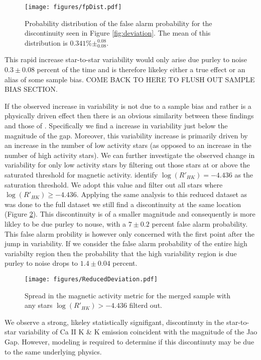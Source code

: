 \begin{figure}
  \centering
  \texttt{[image: figures/fpDist.pdf]}
  \caption{Probability distribution of the false alarm probability for the
  discontinuity seen in Figure \ref{fig:deviation}. The mean of this
  distribution is $0.341\%\pm^{0.08}_{0.08}$.}
  \label{fig:dist}
\end{figure}

This rapid increase star-to-star variability would only arise due purley to
noise $0.3\pm0.08$ percent of the time and is therefore likeley either a true
effect or an alias of some sample bias. {\color{red} COME BACK TO HERE TO FLUSH
OUT SAMPLE BIAS SECTION.}

If the observed increase in variability is not due to a sample bias and rather
is a physically driven effect then there is an obvious similarity between these
findings and those of \citep{Jao2023}. Specifically we find a increase in
variability just below the magnitude of the gap. Moreover, this variability
increase is primarily driven by an increase in the number of low activity stars
(as opposed to an increase in the number of high activity stars). We can
further investigate the observed change in variability for only low activity
stars by filtering out those stars at or above the saturated threshold for
magnetic activity. \citet{Boudreaux2022} identify $\log(R'_{HK}) = -4.436$ as
the saturation threshold. We adopt this value and filter out all stars where
$\log(R'_{HK}) \geq -4.436$. Applying the same analysis to this reduced dataset
as was done to the full dataset we still find a discontinuity at the same
location (Figure \ref{fig:reduced}). This discontinuity is of a smaller
magnitude and consequently is more likley to be due purley to nouse, with a
$7\pm0.2$ percent false alarm probability. This false alarm probility is
however only concerned with the first point after the jump in variability. If
we consider the false alarm probability of the entire high variabilty region
then the probability that the high variability region is due purley to noise
drops to $1.4\pm0.04$ percent.

\begin{figure}
  \centering
  \texttt{[image: figures/ReducedDeviation.pdf]}
  \caption{Spread in the magnetic activity metric for the merged sample with
  any stars $\log(R'_{HK}) > -4.436$ filterd out.}
  \label{fig:reduced}
\end{figure}

We observe a strong, likeley statistically signifigant, discontinuty in the
star-to-star variability of Ca II K \& K emission coincident with the magnitude
of the Jao Gap. However, modeling is required to determine if this discontinuty
may be due to the same underlying physics.

